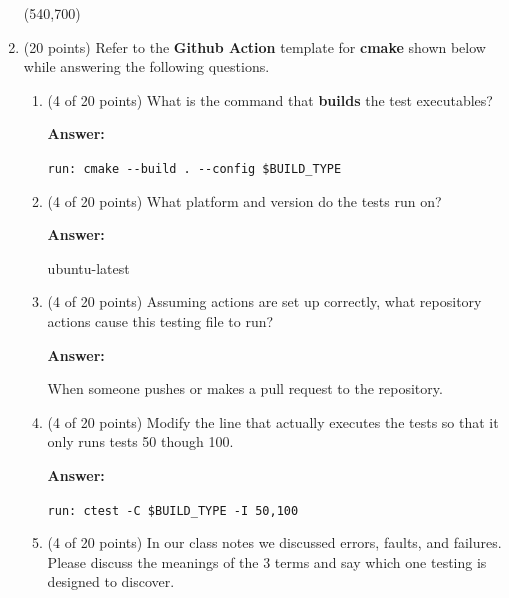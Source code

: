 \documentclass[10pt]{article}
\begin{document}
\begin{enumerate}
	    

    \beginanswers
    	
    \else
	\hspace*{-0.4in}\framebox(540,700){}
\fi

\newpage

\item (20 points) Refer to the \textbf{Github Action} template for \textbf{cmake} shown below while
	answering the following questions.
	


\begin{enumerate}
	\item (4 of 20 points) What is the command that \textbf{builds} the test executables?
	
	\beginanswers
		\textbf{Answer:}

		\bigskip
		\verb|run: cmake --build . --config $BUILD_TYPE|
		\bigskip
	\else
	\bigskip
	\bigskip
	\bigskip
	\bigskip
	\bigskip
	\bigskip
	\bigskip
	\bigskip
	\bigskip
	\bigskip
	\fi

	\item (4 of 20 points) What platform and version do the tests run on?
	
	\beginanswers
		\textbf{Answer:}

		\bigskip
	ubuntu-latest
		\bigskip
	\else
	\bigskip
	\bigskip
	\bigskip
	\bigskip
	\bigskip
	\bigskip
	\bigskip
	\bigskip
	\bigskip
	\bigskip
	\fi

	\item (4 of 20 points) Assuming actions are set up correctly, what repository actions 
		cause this testing file
		to run?
	
	\beginanswers
		\textbf{Answer:}

		\bigskip
	When someone pushes or makes a pull request to the repository.
		\bigskip
	\else
	\bigskip
	\bigskip
	\bigskip
	\bigskip
	\bigskip
	\bigskip
	\bigskip
	\bigskip
	\bigskip
	\bigskip
	\fi

	\item (4 of 20 points) Modify the line that actually executes the tests so that it only
		runs tests 50 though 100.
	
	\beginanswers
		\textbf{Answer:}

		\bigskip
		\verb|run: ctest -C $BUILD_TYPE -I 50,100|
		\bigskip
	\else
	\bigskip
	\bigskip
	\bigskip
	\bigskip
	\bigskip
	\bigskip
	\bigskip
	\bigskip
	\bigskip
	\bigskip
	\fi

	\item (4 of 20 points) In our class notes we discussed errors, faults, and failures. Please discuss
		the meanings of the 3 terms and say which one testing is designed to discover.
	

\end{enumerate}
\end{enumerate}
\end{document}
